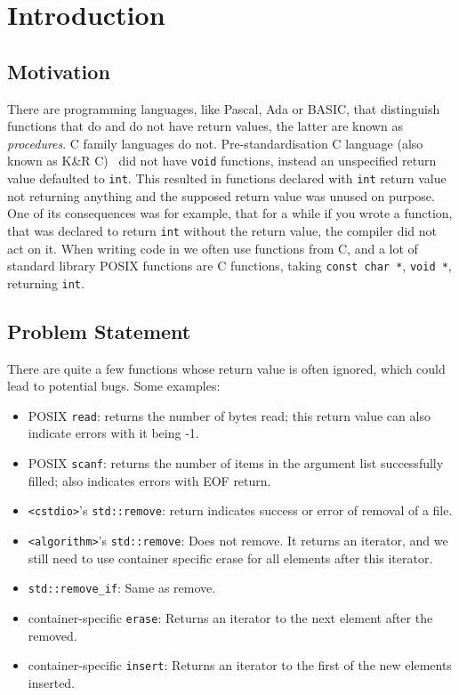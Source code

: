 
\chapter{Introduction}
\label{ch:intro}

\section{Motivation}

There are programming languages, like Pascal, Ada or BASIC, that distinguish functions that do and do not
have return values,
the latter are known as \emph{procedures}. C family languages do not. Pre-standardisation C language (also known as K\&R C)~\cite{kandr}
did not have \texttt{void} functions,
instead an unspecified return value defaulted to \texttt{int}. This resulted in functions declared with \texttt{int} return value
not returning anything and the supposed return value was unused on purpose. One of its consequences was for example, that for a while if
you wrote a function, that was declared to return \texttt{int} without the return value, the compiler did not act on it. When writing
code in \CC{} we often use functions from C, and a lot of standard library POSIX functions are C functions, taking \texttt{const char *},
\texttt{void *}, returning \texttt{int}.

\section{Problem Statement}
\label{sec:prob-state}

There are quite a few functions whose return value is often ignored, which could lead to potential bugs. Some examples:

\begin{itemize}
    \item POSIX \texttt{read}: returns the number of bytes read; this return value can also indicate errors with it being -1.
    \item POSIX \texttt{scanf}: returns the number of items in the argument list successfully filled; also indicates errors with EOF return.
    \item \texttt{<cstdio>}'s \texttt{std::remove}: return indicates success or error of removal of a file.
    \item \texttt{<algorithm>}'s \texttt{std::remove}: Does not remove. It returns an iterator, and we still need to use container specific erase
    for all elements after this iterator.
    \item \texttt{std::remove_if}: Same as remove.
    \item container-specific \texttt{erase}: Returns an iterator to the next element after the removed.
    \item container-specific \texttt{insert}: Returns an iterator to the first of the new elements inserted.
\end{itemize}


